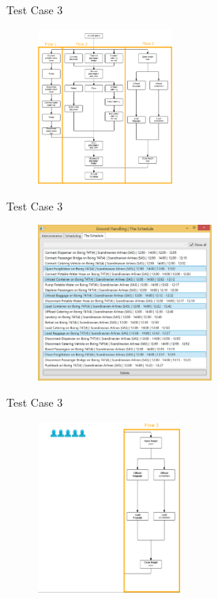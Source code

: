 \begin{frame}{Test Case 3}
\begin{figure}
    \centering
    \includegraphics[width=170px]{Grafik/TestCase3Illu}
\end{figure}
\end{frame}

\begin{frame}{Test Case 3}
\begin{figure}
    \centering
    \includegraphics[width=220px]{Grafik/TestCase3Result}
\end{figure}
\end{frame}

\begin{frame}{Test Case 3}
\begin{figure}
    \centering
    \includegraphics[width=180px]{Grafik/Flow3/Flow3-0-1}
\end{figure}
\end{frame}

